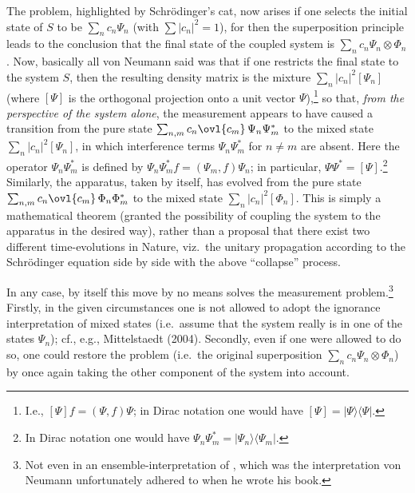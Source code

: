 \documentclass[12pt]{article}
\newcommand{\ot}{\otimes}
\begin{document}
The problem, highlighted by Schr\"{o}dinger's cat,  now arises if one selects the initial state of $S$ to be $\sum_n c_n \Psi_n$ (with $\sum |c_n|^2=1$), for then the superposition principle leads to the conclusion that the final state of the coupled system is $\sum_n c_n \Psi_n \ot\Phi_n$. 
 Now, basically all von Neumann said was that if one restricts the final state to the  system $S$, then the resulting density matrix is the mixture $\sum_n |c_n|^2 
 [\Psi_n]$ (where $[\Psi]$ is the orthogonal projection onto a unit vector $\Psi$),\footnote{I.e., $[\Psi]f=(\Psi,f)\Psi$; in Dirac notation one would have $[\Psi]=|\Psi\rangle\langle\Psi|$.} so that, {\it from the perspective of the system alone}, the measurement appears to have caused a transition from the pure state
 $\sum_{n,m} c_n\ovl{c_m}\, \Psi_n\Psi_m^*$
 to the mixed state 
 $\sum_n |c_n|^2 [\Psi_n]$, in which interference terms $\Psi_n\Psi_m^*$ for $n\neq m$
are absent. Here the operator $\Psi_n\Psi_m^*$ is defined by $\Psi_n\Psi_m^*f=(\Psi_m,f)\Psi_n$; in particular, $\Psi\Psi^*=[\Psi]$.\footnote{In
Dirac notation one would have  $\Psi_n\Psi_m^*=|\Psi_n\rangle\langle\Psi_m|$. }
 Similarly, the apparatus, taken by itself, has evolved from  the pure state $\sum_{n,m} c_n\ovl{c_m}\, \Phi_n\Phi^*_m$ to the mixed state 
 $\sum_n |c_n|^2  [\Phi_n]$. This is simply a mathematical theorem (granted the possibility of coupling the system to the apparatus in the desired way), rather than a proposal that there exist two different time-evolutions in Nature, viz.\ the unitary propagation according to the Schr\"{o}dinger equation side by side with the above ``collapse'' process.

In any case, by itself this move by no means solves the measurement problem.\footnote{Not even  in an ensemble-interpretation of \qm, which was the interpretation von Neumann unfortunately adhered to when he wrote his book.}  
Firstly, in the given circumstances one is not allowed to adopt the ignorance interpretation of mixed states (i.e.\ assume that the system really is in one of the states $\Psi_n$); cf., e.g., Mittelstaedt (2004). Secondly, even if one were allowed to do so, one could restore the problem (i.e.\ the original superposition $\sum_n c_n \Psi_n\ot \Phi_n$) by once again taking the other component of the system into account. 
\end{document}
